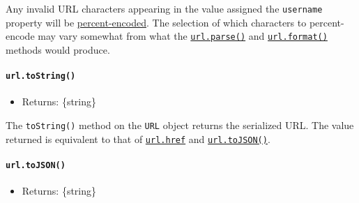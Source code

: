 \begin{Shaded}
\begin{Highlighting}[]
\OperatorTok{=}  \NormalTok{(}\NormalTok{)}\OperatorTok{;}
\NormalTok{)}\OperatorTok{;}

 \OperatorTok{=} \StringTok{\textquotesingle{}123\textquotesingle{}}\OperatorTok{;}
\NormalTok{)}\OperatorTok{;}
\end{Highlighting}
\end{Shaded}

Any invalid URL characters appearing in the value assigned the
\texttt{username} property will be
\hyperref[percent-encoding-in-urls]{percent-encoded}. The selection of
which characters to percent-encode may vary somewhat from what the
\hyperref[urlparseurlstring-parsequerystring-slashesdenotehost]{\texttt{url.parse()}}
and \hyperref[urlformaturlobject]{\texttt{url.format()}} methods would
produce.

\paragraph{\texorpdfstring{\texttt{url.toString()}}{url.toString()}}\label{url.tostring}

\begin{itemize}
\tightlist
\item
  Returns: \{string\}
\end{itemize}

The \texttt{toString()} method on the \texttt{URL} object returns the
serialized URL. The value returned is equivalent to that of
\hyperref[urlhref]{\texttt{url.href}} and
\hyperref[urltojson]{\texttt{url.toJSON()}}.

\paragraph{\texorpdfstring{\texttt{url.toJSON()}}{url.toJSON()}}\label{url.tojson}

\begin{itemize}
\tightlist
\item
  Returns: \{string\}
\end{itemize}

